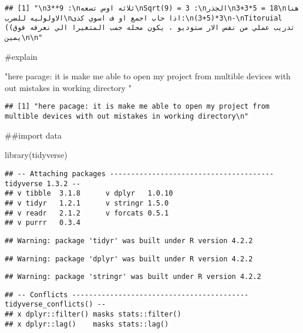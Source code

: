 \documentclass[
]{article}
\newenvironment{Shaded}{\begin{snugshade}}{\end{snugshade}}
\newcommand{\FunctionTok}[1]{\textcolor[rgb]{0.00,0.00,0.00}{#1}}
\newcommand{\NormalTok}[1]{#1}
\newcommand{\StringTok}[1]{\textcolor[rgb]{0.31,0.60,0.02}{#1}}
\begin{document}
\begin{verbatim}
## [1] "\n3**9 :\nثلاثه اوس تسعه\nSqrt(9) = 3 :\nالجذر\n3+3*5 = 18\nهنا الاولوليه للضرب\nاذا حاب اجمع او ف اسوي كذى:\n(3+5)*3\n-\nTitoruial ((تدريب عملي من نفس الار ستوديو ، يكون محله جمب المتغيرا الي نعرفه فوق يمين\n\n"
\end{verbatim}

\#explain

\begin{Shaded}
\begin{Highlighting}[]
\StringTok{"here pacage: it is make me able to open my project from multible devices with out mistakes in working directory}
\StringTok{"}
\end{Highlighting}
\end{Shaded}

\begin{verbatim}
## [1] "here pacage: it is make me able to open my project from multible devices with out mistakes in working directory\n"
\end{verbatim}

\#\#import data

\begin{Shaded}
\begin{Highlighting}[]
\FunctionTok{library}\NormalTok{(tidyverse)}
\end{Highlighting}
\end{Shaded}

\begin{verbatim}
## -- Attaching packages --------------------------------------- tidyverse 1.3.2 --
## v tibble  3.1.8      v dplyr   1.0.10
## v tidyr   1.2.1      v stringr 1.5.0 
## v readr   2.1.2      v forcats 0.5.1 
## v purrr   0.3.4
\end{verbatim}

\begin{verbatim}
## Warning: package 'tidyr' was built under R version 4.2.2
\end{verbatim}

\begin{verbatim}
## Warning: package 'dplyr' was built under R version 4.2.2
\end{verbatim}

\begin{verbatim}
## Warning: package 'stringr' was built under R version 4.2.2
\end{verbatim}

\begin{verbatim}
## -- Conflicts ------------------------------------------ tidyverse_conflicts() --
## x dplyr::filter() masks stats::filter()
## x dplyr::lag()    masks stats::lag()
\end{verbatim}
\end{document}
